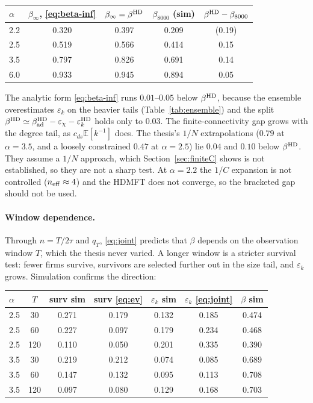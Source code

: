 \documentclass[11pt]{article}
\newcommand{\E}{\mathbb E}
\theoremstyle{remark}
\begin{document}
\begin{center}
\small
\begin{tabular}{lcccc}
\toprule
$\alpha$ & $\beta_\infty$, \eqref{eq:beta-inf} & $\beta_\infty=\beta^{\rm HD}$
 & $\beta_{8000}$ (sim) & $\beta^{\rm HD}-\beta_{8000}$\\
\midrule
2.2 & 0.320 & 0.397 & 0.209 & (0.19)\\
2.5 & 0.519 & 0.566 & 0.414 & 0.15\\
3.5 & 0.797 & 0.826 & 0.691 & 0.14\\
6.0 & 0.933 & 0.945 & 0.894 & 0.05\\
\bottomrule
\end{tabular}
\end{center}

The analytic form \eqref{eq:beta-inf} runs $0.01$--$0.05$ below $\beta^{\rm HD}$, because the
ensemble overestimates $\varepsilon_k$ on the heavier tails (Table~\ref{tab:ensemble}) and
the split $\beta^{\rm HD}\simeq\beta_{\rm ad}^{\rm HD}-\varepsilon_\chi-\varepsilon_k^{\rm HD}$ holds
only to $0.03$.  The
finite-connectivity gap grows with the degree tail, as $c_{ds}\E[k^{-1}]$ does.  The thesis's
$1/N$ extrapolations ($0.79$ at $\alpha=3.5$, and a loosely constrained $0.47$ at $\alpha=2.5$)
lie $0.04$ and $0.10$ below $\beta^{\rm HD}$.  They assume a $1/N$ approach, which
Section~\ref{sec:finiteC} shows is not established, so they are not a sharp test.  At
$\alpha=2.2$ the $1/C$ expansion is not controlled ($n_{\rm eff}\approx4$) and the HDMFT does not
converge, so the bracketed gap should not be used.

\paragraph{Window dependence.}
Through $n=T/2\tau$ and $q_T$, \eqref{eq:joint} predicts that $\beta$ depends on the
observation window $T$, which the thesis never varied.  A longer window is a stricter survival
test: fewer firms survive, survivors are selected further out in the size tail, and
$\varepsilon_k$ grows.  Simulation confirms the direction:

\begin{center}
\small
\begin{tabular}{lc|cc|cc|c}
\toprule
$\alpha$ & $T$ & surv sim & surv \eqref{eq:ev} & $\varepsilon_k$ sim & $\varepsilon_k$
 \eqref{eq:joint} & $\beta$ sim\\
\midrule
2.5 & 30  & 0.271 & 0.179 & 0.132 & 0.185 & 0.474\\
2.5 & 60  & 0.227 & 0.097 & 0.179 & 0.234 & 0.468\\
2.5 & 120 & 0.110 & 0.050 & 0.201 & 0.335 & 0.390\\
3.5 & 30  & 0.219 & 0.212 & 0.074 & 0.085 & 0.689\\
3.5 & 60  & 0.147 & 0.132 & 0.095 & 0.113 & 0.708\\
3.5 & 120 & 0.097 & 0.080 & 0.129 & 0.168 & 0.703\\
\bottomrule
\end{tabular}
\end{center}
\end{document}
